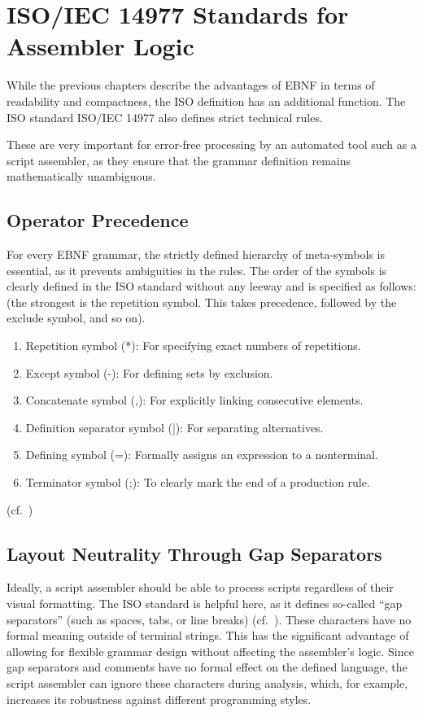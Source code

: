 \section{ISO/IEC 14977 Standards for Assembler Logic}

While the previous chapters describe the advantages of EBNF in terms of readability and compactness, the ISO definition has an additional function. The ISO standard ISO/IEC 14977 also defines strict technical rules.

These are very important for error-free processing by an automated tool such as a script assembler, as they ensure that the grammar definition remains mathematically unambiguous.

\subsection{Operator Precedence}

For every EBNF grammar, the strictly defined hierarchy of meta-symbols is essential, as it prevents ambiguities in the rules.
The order of the symbols is clearly defined in the ISO standard without any leeway and is specified as follows: (the strongest is the repetition symbol. This takes precedence, followed by the exclude symbol, and so on).
\begin{enumerate}
\item Repetition symbol (*): For specifying exact numbers of repetitions.
\item Except symbol (-): For defining sets by exclusion.
\item Concatenate symbol (,): For explicitly linking consecutive elements.
\item Definition separator symbol (|): For separating alternatives.
\item Defining symbol (=): Formally assigns an expression to a nonterminal.
\item Terminator symbol (;): To clearly mark the end of a production rule.
\end{enumerate}

(cf.~\cite[p.~1]{ISO/IEC149771996InformationBNF})

\subsection{Layout Neutrality Through Gap Separators}

Ideally, a script assembler should be able to process scripts regardless of their visual formatting. The ISO standard is helpful here, as it defines so-called ``gap separators'' (such as spaces, tabs, or line breaks) (cf.~\cite[pp.~5]{ISO/IEC149771996InformationBNF}). These characters have no formal meaning outside of terminal strings. This has the significant advantage of allowing for flexible grammar design without affecting the assembler's logic. Since gap separators and comments have no formal effect on the defined language, the script assembler can ignore these characters during analysis, which, for example, increases its robustness against different programming styles.

